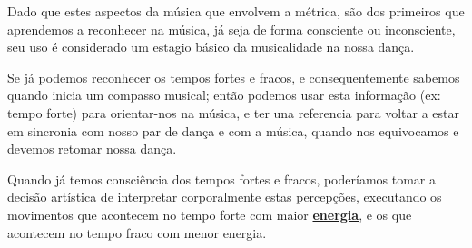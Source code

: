Dado que estes aspectos da música que envolvem a métrica, são dos primeiros que aprendemos a reconhecer na música,
já seja de forma consciente ou inconsciente,
seu uso é considerado um estagio básico da musicalidade na nossa dança.
 

\begin{example}
Se já podemos reconhecer os tempos fortes e fracos, 
e consequentemente sabemos quando inicia um compasso musical;
então podemos usar esta informação (ex: tempo forte) para orientar-nos na música,
e ter una referencia para voltar a estar em sincronia com  nosso par de dança e com a música, 
quando nos equivocamos e devemos retomar nossa dança.
\end{example}


\begin{example}
Quando já temos consciência dos tempos fortes e fracos,
poderíamos tomar a decisão artística de interpretar corporalmente estas percepções, 
executando os movimentos que acontecem no tempo forte com maior \hyperref[sec:musicalidadenergia]{\textbf{energia}},
e os que acontecem no tempo fraco com menor energia.
\end{example}

